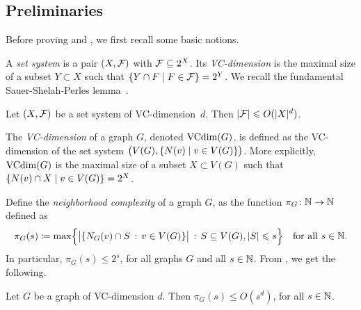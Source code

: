 




\subsection{Preliminaries}
Before proving  and , 
we first recall some basic notions.

\medskip
A \emph{set system} is a pair $(X,\cal F)$ with $\cal F\subset 2^X$.
Its \emph{VC-dimension} is the maximal size of a subset $Y\subset X$ such that 
$\setof{Y\cap F}{F\in\cal F}=2^Y$.
We recall the fundamental Sauer-Shelah-Perles lemma~\cite{sauer,shelah-sauer-lemma}.

\begin{lemma}\label{lem:sauer-shelah-perles}
  Let $(X,\cal F)$ be a set system of VC-dimension~$d$.
  Then $|\cal F|\le O(|X|^d)$.
\end{lemma}

The \emph{VC-dimension} of a graph $G$, denoted $\VCdim(G)$, 
is defined as the VC-dimension of the set system $\bigl(V(G),\setof{N(v)}{v\in V(G)}\bigr)$.
More explicitly, $\VCdim(G)$ is the maximal size of a subset $X\subset V(G)$
such that $\setof{N(v)\cap X}{v\in V(G)}=2^X$.

Define the \emph{neighborhood complexity} of a graph $G$, as the function $\pi_G\from\N\to\N$ defined as
 $$\pi_G(s)\coloneqq\max\Bigl\{\bigl|\{N_G(v)\cap S\,:\,v\in V(G)\}\bigr|\,:\, S\subset V(G), |S|\le s\Bigr\} \quad\text{for all }s \in \N.$$
In particular, $\pi_G(s)\le 2^s$, for all graphs $G$ and all $s\in\N$.
From , we get the following.
\begin{corollary}\label{cor:sauer-shelah}
    Let $G$ be a graph of VC-dimension $d$.
    Then $\pi_G(s)\le O(s^d)$, for all $s\in \N$.
\end{corollary}



